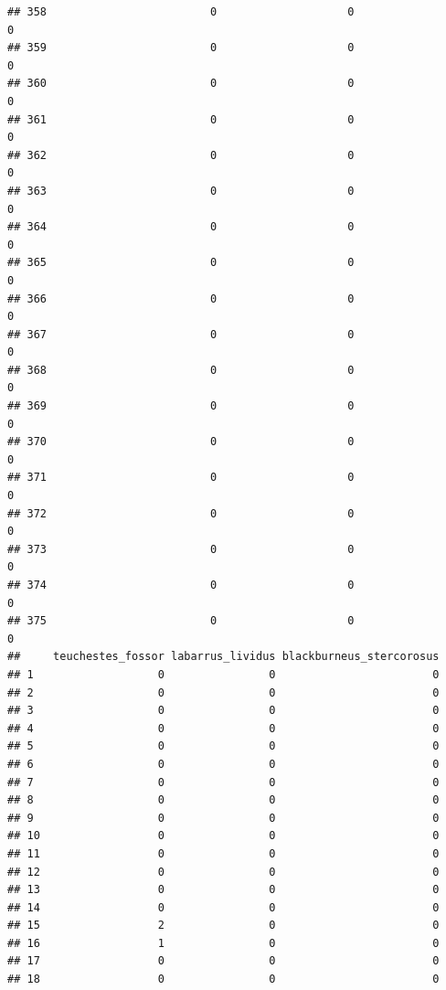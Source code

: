 \documentclass[
]{article}
\begin{document}
\begin{verbatim}
## 358                         0                    0                      0
## 359                         0                    0                      0
## 360                         0                    0                      0
## 361                         0                    0                      0
## 362                         0                    0                      0
## 363                         0                    0                      0
## 364                         0                    0                      0
## 365                         0                    0                      0
## 366                         0                    0                      0
## 367                         0                    0                      0
## 368                         0                    0                      0
## 369                         0                    0                      0
## 370                         0                    0                      0
## 371                         0                    0                      0
## 372                         0                    0                      0
## 373                         0                    0                      0
## 374                         0                    0                      0
## 375                         0                    0                      0
##     teuchestes_fossor labarrus_lividus blackburneus_stercorosus
## 1                   0                0                        0
## 2                   0                0                        0
## 3                   0                0                        0
## 4                   0                0                        0
## 5                   0                0                        0
## 6                   0                0                        0
## 7                   0                0                        0
## 8                   0                0                        0
## 9                   0                0                        0
## 10                  0                0                        0
## 11                  0                0                        0
## 12                  0                0                        0
## 13                  0                0                        0
## 14                  0                0                        0
## 15                  2                0                        0
## 16                  1                0                        0
## 17                  0                0                        0
## 18                  0                0                        0

\end{verbatim}
\end{document}
